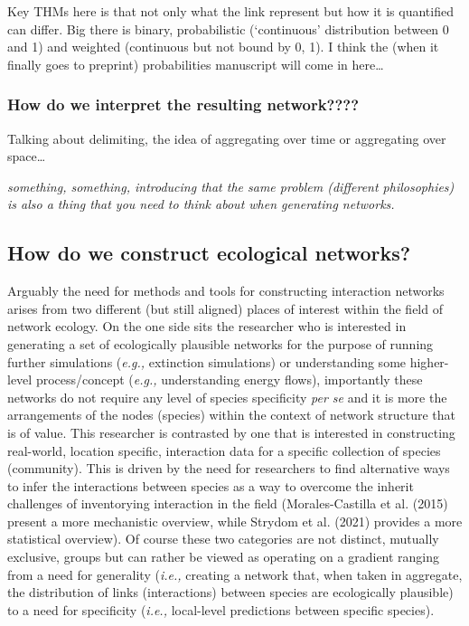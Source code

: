 \documentclass[
]{agujournal2019}
\begin{document}
Key THMs here is that not only what the link represent but how it is
quantified can differ. Big there is binary, probabilistic (`continuous'
distribution between 0 and 1) and weighted (continuous but not bound by
0, 1). I think the (when it finally goes to preprint) probabilities
manuscript will come in here\ldots{}

\subsubsection{How do we interpret the resulting
network????}\label{how-do-we-interpret-the-resulting-network}

Talking about delimiting, the idea of aggregating over time or
aggregating over space\ldots{}

\emph{something, something, introducing that the same problem (different
philosophies) is also a thing that you need to think about when
generating networks.}

\subsection{How do we construct ecological
networks?}\label{how-do-we-construct-ecological-networks}

Arguably the need for methods and tools for constructing interaction
networks arises from two different (but still aligned) places of
interest within the field of network ecology. On the one side sits the
researcher who is interested in generating a set of ecologically
plausible networks for the purpose of running further simulations
(\emph{e.g.,} extinction simulations) or understanding some higher-level
process/concept (\emph{e.g.,} understanding energy flows), importantly
these networks do not require any level of species specificity \emph{per
se} and it is more the arrangements of the nodes (species) within the
context of network structure that is of value. This researcher is
contrasted by one that is interested in constructing real-world,
location specific, interaction data for a specific collection of species
(community). This is driven by the need for researchers to find
alternative ways to infer the interactions between species as a way to
overcome the inherit challenges of inventorying interaction in the field
(Morales-Castilla et al. (2015) present a more mechanistic overview,
while Strydom et al. (2021) provides a more statistical overview). Of
course these two categories are not distinct, mutually exclusive, groups
but can rather be viewed as operating on a gradient ranging from a need
for generality (\emph{i.e.,} creating a network that, when taken in
aggregate, the distribution of links (interactions) between species are
ecologically plausible) to a need for specificity (\emph{i.e.,}
local-level predictions between specific species).
\end{document}
